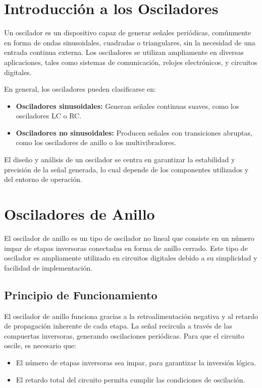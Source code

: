 \documentclass[11pt, a4paper]{article}
\begin{document}


\section{Introducción a los Osciladores}

Un oscilador es un dispositivo capaz de generar señales periódicas, comúnmente en forma de ondas sinusoidales, cuadradas o triangulares, sin la necesidad de una entrada continua externa. Los osciladores se utilizan ampliamente en diversas aplicaciones, tales como sistemas de comunicación, relojes electrónicos, y circuitos digitales. 

En general, los osciladores pueden clasificarse en:
\begin{itemize}
    \item \textbf{Osciladores sinusoidales:} Generan señales continuas suaves, como los osciladores LC o RC.
    \item \textbf{Osciladores no sinusoidales:} Producen señales con transiciones abruptas, como los osciladores de anillo o los multivibradores.
\end{itemize}

El diseño y análisis de un oscilador se centra en garantizar la estabilidad y precisión de la señal generada, lo cual depende de los componentes utilizados y del entorno de operación.

\section{Osciladores de Anillo}

El oscilador de anillo es un tipo de oscilador no lineal que consiste en un número impar de etapas inversoras conectadas en forma de anillo cerrado. Este tipo de oscilador es ampliamente utilizado en circuitos digitales debido a su simplicidad y facilidad de implementación.

\subsection{Principio de Funcionamiento}

El oscilador de anillo funciona gracias a la retroalimentación negativa y al retardo de propagación inherente de cada etapa. La señal recircula a través de las compuertas inversoras, generando oscilaciones periódicas. Para que el circuito oscile, es necesario que:
\begin{itemize}
    \item El número de etapas inversoras sea impar, para garantizar la inversión lógica.
    \item El retardo total del circuito permita cumplir las condiciones de oscilación.
\end{itemize}
\end{document}
